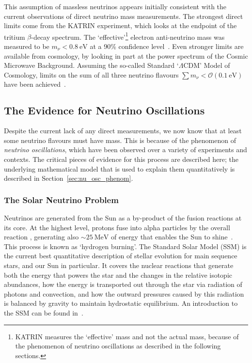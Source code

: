 This assumption of massless neutrinos appears initially consistent with the current observations of direct neutrino mass measurements. The strongest direct limits come from the KATRIN experiment, which looks at the endpoint of the tritium $\beta$-decay spectrum. The `effective'\footnote{
    KATRIN measures the `effective' mass and not the actual mass, because of the phenomenon of neutrino oscillations as described in the following sections.
} electron anti-neutrino mass was measured to be $m_{\nu} < \SI{0.8}{\eV}$ at a 90\% confidence level~\cite{akerDirectNeutrinomassMeasurement2022}. %
Even stronger limits are available from cosmology, by looking in part at the power spectrum of the Cosmic Microwave Background. Assuming the so-called Standard `$\Lambda$CDM' Model of Cosmology, limits on the sum of all three neutrino flavours $\sum m_{\nu}<\mathcal{O}(\SI{0.1}{\eV})$ have been achieved~\cite{divalentinoMostConstrainingCosmological2021}. %

\subsection{The Evidence for Neutrino Oscillations}\label{sec:nu_osc_evidence}
Despite the current lack of any direct measurements, we now know that at least some neutrino flavours must have mass. This is because of the phenomenon of \textit{neutrino oscillations}, which have been observed over a variety of experiments and contexts. The critical pieces of evidence for this process are described here; the underlying mathematical model that is used to explain them quantitatively is described in Section~\ref{sec:nu_osc_phenom}.

\subsubsection{The Solar Neutrino Problem}
Neutrinos are generated from the Sun as a by-product of the fusion reactions at its core. At the highest level, protons fuse into alpha particles by the overall reaction , generating also $\sim\SI{25}{\MeV}$ of energy that enables the Sun to shine~\cite{bahcallNeutrinoAstrophysics1989}. %
This process is known as `hydrogen burning'. The Standard Solar Model (SSM) is the current best quantitative description of stellar evolution for main sequence stars, and our Sun in particular. It covers the nuclear reactions that generate both the energy that powers the star and the changes in the relative isotopic abundances, how the energy is transported out through the star via radiation of photons and convection, and how the outward pressures caused by this radiation is balanced by gravity to maintain hydrostatic equilibrium. An introduction to the SSM can be found in~\cite{bahcallNeutrinoAstrophysics1989}. %

